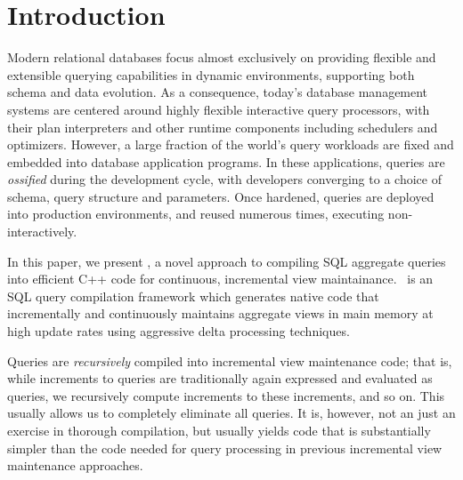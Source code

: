 \section{Introduction}





Modern relational databases  focus almost exclusively
on providing flexible and  extensible querying capabilities in dynamic
environments, supporting  both schema and data  evolution.
As a consequence, today's database management systems are centered around
highly  flexible interactive query processors, with their
plan  interpreters and other  runtime components  including schedulers
and optimizers.   However, a
large fraction of  the world's query workloads are  fixed and embedded
into database application programs. In these applications, queries are
\textit{ossified}  during  the   development  cycle,  with  developers
converging to a choice of schema, query structure and parameters. Once
hardened,  queries  are  deployed  into production  environments,  and
re\-used numerous times, executing non-interactively.



In this paper, we present \compiler,
a novel approach to compiling SQL aggregate queries into
efficient C++ code for  continuous, incremental view maintainance.  
\compiler\ is an SQL query compilation framework which generates native code
that incrementally  and continuously maintains aggregate views in main memory
at high update rates using aggressive delta processing techniques.

Queries are {\em recursively}\/ compiled into incremental view maintenance
code; that is, while increments to queries are traditionally again expressed and evaluated as que\-ries, we recursively compute increments to these increments, and so on. This usually allows us to completely eliminate all queries.
It is, however, not an just an exercise in thorough compilation, but usually
yields code that is substantially simpler than the code needed for query processing in previous incremental view maintenance approaches.

